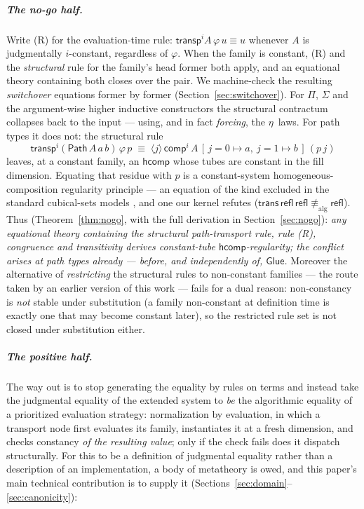 \documentclass{lmcs}
\newcommand{\transp}{\mathsf{transp}}
\newcommand{\hcomp}{\mathsf{hcomp}}
\newcommand{\vcomp}{\mathsf{comp}}
\newcommand{\refl}{\mathsf{refl}}
\newcommand{\Glue}{\mathsf{Glue}}
\renewcommand{\conv}{\equiv}
\newcommand{\aconv}{\equiv_{\mathrm{alg}}}
\newcommand{\Path}{\mathsf{Path}}
\begin{document}
\subparagraph*{The no-go half.}  Write (R) for the evaluation-time
rule: $\transp^i A\,\varphi\,u \conv u$ whenever $A$ is judgmentally
$i$-constant, regardless of $\varphi$.  When the family is constant,
(R) and the \emph{structural} rule for the family's head former both
apply, and an equational theory containing both closes over the pair.
We machine-check the resulting \emph{switchover} equations former by
former (Section~\ref{sec:switchover}).  For $\Pi$, $\Sigma$ and the
argument-wise higher inductive constructors the structural contractum
collapses back to the input --- using, and in fact \emph{forcing},
the $\eta$~laws.  For path types it does not: the structural rule
\[
  \transp^i (\Path\,A\,a\,b)\,\varphi\,p \;\conv\;
  \langle j \rangle\, \vcomp^i\,A\,[\,j{=}0 \mapsto a,\ j{=}1 \mapsto
  b\,]\,(p\,j)
\]
leaves, at a constant family, an $\hcomp$ whose tubes are constant in
the fill dimension.  Equating that residue with $p$ is a
constant-system homogeneous-composition regularity principle --- an
equation of the kind excluded in the standard cubical-sets models
\cite{SwanRegularity,SattlerNote}, and one our kernel refutes
($\mathsf{trans}\,\refl\,\refl \not\aconv \refl$).  Thus
(Theorem~\ref{thm:nogo}, with the full derivation in
Section~\ref{sec:nogo}): \emph{any equational theory containing the
structural path-transport rule, rule (R), congruence and transitivity
derives constant-tube $\hcomp$-regularity; the conflict arises at
path types already --- before, and independently of, $\Glue$.}
Moreover the alternative of \emph{restricting} the structural rules
to non-constant families --- the route taken by an earlier version of
this work --- fails for a dual reason: non-constancy is \emph{not}
stable under substitution (a family non-constant at definition time
is exactly one that may become constant later), so the restricted
rule set is not closed under substitution either.

\subparagraph*{The positive half.}  The way out is to stop generating
the equality by rules on terms and instead take the judgmental
equality of the extended system to \emph{be} the algorithmic equality
of a prioritized evaluation strategy: normalization by evaluation, in
which a transport node first evaluates its family, instantiates it at
a fresh dimension, and checks constancy \emph{of the resulting
value}; only if the check fails does it dispatch structurally.  For
this to be a definition of judgmental equality rather than a
description of an implementation, a body of metatheory is owed, and
this paper's main technical contribution is to supply it
(Sections~\ref{sec:domain}--\ref{sec:canonicity}):
\end{document}
